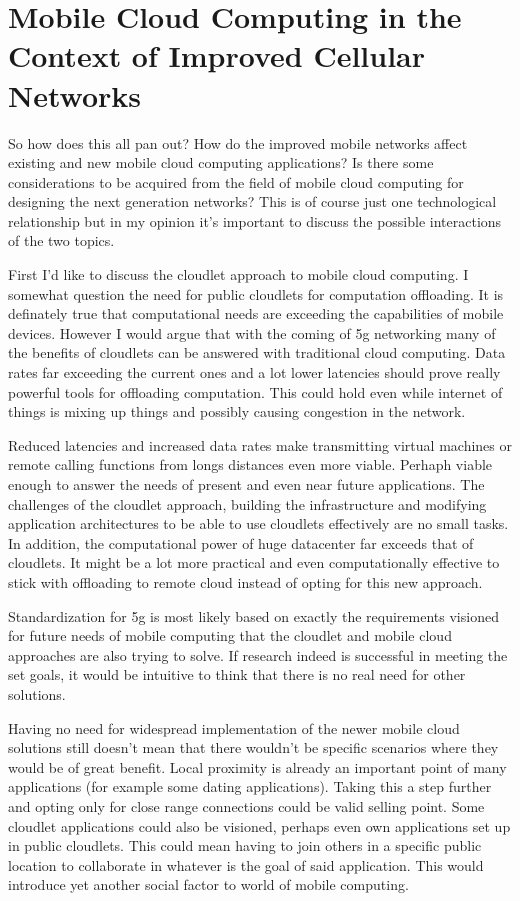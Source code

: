 \documentclass[conference]{IEEEtran}
\begin{document}
\section{Mobile Cloud Computing in the Context of Improved Cellular Networks}
So how does this all pan out? How do the improved mobile networks affect existing and new mobile cloud computing applications? Is there some considerations to be acquired from the field of mobile cloud computing for designing the next generation networks? This is of course just one technological relationship but in my opinion it's important to discuss the possible interactions of the two topics.
\par
First I'd like to discuss the cloudlet approach to mobile cloud computing. I somewhat question the need for public cloudlets for computation offloading. It is definately true that computational needs are exceeding the capabilities of mobile devices. However I would argue that with the coming of 5g networking many of the benefits of cloudlets can be answered with traditional cloud computing. Data rates far exceeding the current ones and a lot lower latencies should prove really powerful tools for offloading computation. This could hold even while internet of things is mixing up things and possibly causing congestion in the network.
\par
Reduced latencies and increased data rates make transmitting virtual machines or remote calling functions from longs distances even more viable. Perhaph viable enough to answer the needs of present and even near future applications. The challenges of the cloudlet approach, building the infrastructure and modifying application architectures to be able to use cloudlets effectively are no small tasks. In addition, the computational power of huge datacenter far exceeds that of cloudlets. It might be a lot more practical and even computationally effective to stick with offloading to remote cloud instead of opting for this new approach.
\par
Standardization for 5g is most likely based on exactly the requirements visioned for future needs of mobile computing that the cloudlet and mobile cloud approaches are also trying to solve. If research indeed is successful in meeting the set goals, it would be intuitive to think that there is no real need for other solutions.
\par
Having no need for widespread implementation of the newer mobile cloud solutions still doesn't mean that there wouldn't be specific scenarios where they would be of great benefit. Local proximity is already an important point of many applications (for example some dating applications). Taking this a step further and opting only for close range connections could be valid selling point. Some cloudlet applications could also be visioned, perhaps even own applications set up in public cloudlets. This could mean having to join others in a specific public location to collaborate in whatever is the goal of said application. This would introduce yet another social factor to world of mobile computing.
\end{document}
